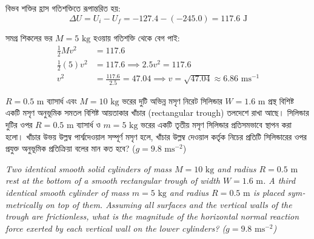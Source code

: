 \documentclass[12pt, a4paper]{article}
\begin{document}
{{\begin{tcolorbox}[solutionbox={সমাধান (Solution)}]
    বিভব শক্তির হ্রাস গতিশক্তিতে রূপান্তরিত হয়:
    \[ \Delta U = U_i - U_f = -127.4 - (-245.0) = 117.6\text{ J} \]
    
    সমগ্র শিকলের ভর $M = 5\text{ kg}$ হওয়ায় গতিশক্তি থেকে বেগ পাই:
    \begin{align*}
        \frac{1}{2} M v^2 &= 117.6 \\
        \frac{1}{2} (5) v^2 &= 117.6 \implies 2.5 v^2 = 117.6 \\
        v^2 &= \frac{117.6}{2.5} = 47.04 \implies v = \sqrt{47.04} \approx \mathbf{6.86}\text{ ms}^{-1}
    \end{align*}
\end{tcolorbox}

\newpage

\begin{tcolorbox}[questionbox={প্রশ্ন (Question) 43}]
    \noindent
    $R = 0.5\text{ m}$ ব্যাসার্ধ এবং $M = 10\text{ kg}$ ভরের দুটি অভিন্ন মসৃণ নিরেট সিলিন্ডার $W = 1.6\text{ m}$ প্রস্থ বিশিষ্ট একটি মসৃণ অনুভূমিক সমতল বিশিষ্ট আয়তাকার খাঁচার (rectangular trough) তলদেশে রাখা আছে। সিলিন্ডার দুটির ওপর $R = 0.5\text{ m}$ ব্যাসার্ধ ও $m = 5\text{ kg}$ ভরের একটি তৃতীয় মসৃণ সিলিন্ডার প্রতিসমভাবে স্থাপন করা হলো। খাঁচার উভয় উল্লম্ব পার্শ্বদেওয়াল সম্পূর্ণ মসৃণ হলে, খাঁচার উল্লম্ব দেওয়াল কর্তৃক নিচের প্রতিটি সিলিন্ডারের ওপর প্রযুক্ত অনুভূমিক প্রতিক্রিয়া বলের মান কত হবে? ($g = 9.8\text{ ms}^{-2}$)
    
    \vspace{0.8em}
    \begin{english}
    \noindent\textit{\color{darkgray}
    Two identical smooth solid cylinders of mass $M = 10\text{ kg}$ and radius $R = 0.5\text{ m}$ rest at the bottom of a smooth rectangular trough of width $W = 1.6\text{ m}$. A third identical smooth cylinder of mass $m = 5\text{ kg}$ and radius $R = 0.5\text{ m}$ is placed symmetrically on top of them. Assuming all surfaces and the vertical walls of the trough are frictionless, what is the magnitude of the horizontal normal reaction force exerted by each vertical wall on the lower cylinders? ($g = 9.8\text{ ms}^{-2}$)
    }
    \end{english}
\end{tcolorbox}

\vspace{1em}
\begin{center}
\end{center}}}
\end{document}

